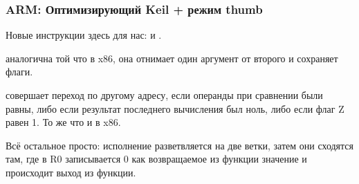 \subsubsection{ARM: Оптимизирующий Keil + режим thumb}



Новые инструкции здесь для нас: \CMP и .

\CMP аналогична той что в x86, она отнимает один аргумент от второго и сохраняет флаги.

 совершает переход по другому адресу, если операнды при сравнении были равны, либо если результат 
последнего вычисления был ноль, либо если флаг Z равен 1. То же что и \JZ в x86.

Всё остальное просто: исполнение разветвляется на две ветки, затем они сходятся там, где в R0 записывается 0
как возвращаемое из функции значение и происходит выход из функции.


